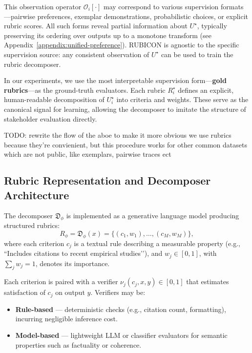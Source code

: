 \documentclass[sigconf]{acmart}
\begin{document}
This observation operator \(\mathcal{O}_i[\cdot]\) may correspond to various supervision formats—pairwise preferences, exemplar demonstrations, probabilistic choices, or explicit rubric scores.
All such forms reveal partial information about \(U^\star\), typically preserving its ordering over outputs up to a monotone transform (see Appendix~\ref{appendix:unified-preference}).
RUBICON is agnostic to the specific supervision source: any consistent observation of \(U^\star\) can be used to train the rubric decomposer.

In our experiments, we use the most interpretable supervision form—\textbf{gold rubrics}—as the ground-truth evaluators. 
Each rubric \(R_i^\star\) defines an explicit, human-readable decomposition of \(U_i^\star\) into criteria and weights.
These serve as the canonical signal for learning, allowing the decomposer to imitate the structure of stakeholder evaluation directly.

TODO: rewrite the flow of the aboe to make it more obvious we use rubrics because they're convienient, but this procedure works for other common datasets which are not public, like exemplars, pairwise traces ect



\subsection{Rubric Representation and Decomposer Architecture}
\label{sec:representation}

The decomposer $\mathfrak{D}_\phi$ is implemented as a generative language model producing structured rubrics:
\begin{equation}
R_\phi = \mathfrak{D}_\phi(x) = \{(c_1, w_1), \ldots, (c_M, w_M)\},
\end{equation}
where each criterion $c_j$ is a textual rule describing a measurable property (e.g., ``Includes citations to recent empirical studies’’), and $w_j \in [0,1]$, with $\sum_j w_j = 1$, denotes its importance.

Each criterion is paired with a verifier $\nu_j(c_j, x, y)\in[0,1]$ that estimates satisfaction of $c_j$ on output $y$. Verifiers may be:
\begin{itemize}
\item \textbf{Rule-based} — deterministic checks (e.g., citation count, formatting), incurring negligible inference cost.
\item \textbf{Model-based} — lightweight LLM or classifier evaluators for semantic properties such as factuality or coherence.
\end{itemize}
\end{document}

